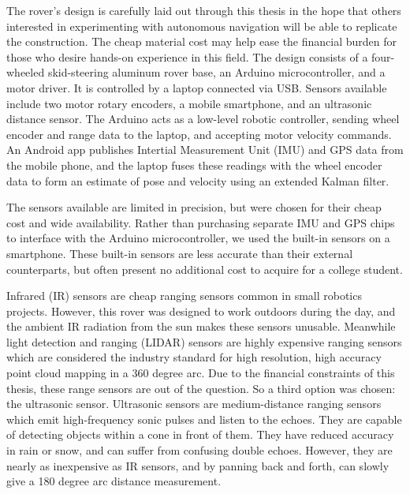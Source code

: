 
The rover's design is carefully laid out through this thesis in the hope that others interested in experimenting with autonomous navigation will be able to replicate the construction. The cheap material cost may help ease the financial burden for those who desire hands-on experience in this field. The design consists of a four-wheeled skid-steering aluminum rover base, an Arduino microcontroller, and a motor driver. It is controlled by a laptop connected via USB. Sensors available include two motor rotary encoders, a mobile smartphone, and an ultrasonic distance sensor. The Arduino acts as a low-level robotic controller, sending wheel encoder and range data to the laptop, and accepting motor velocity commands. An Android app publishes Intertial Measurement Unit (IMU) and GPS data from the mobile phone, and the laptop fuses these readings with the wheel encoder data to form an estimate of pose and velocity using an extended Kalman filter.

The sensors available are limited in precision, but were chosen for their cheap cost and wide availability. Rather than purchasing separate IMU and GPS chips to interface with the Arduino microcontroller, we used the built-in sensors on a smartphone. These built-in sensors are less accurate than their external counterparts, but often present no additional cost to acquire for a college student.

Infrared (IR) sensors are cheap ranging sensors common in small robotics projects. However, this rover was designed to work outdoors during the day, and the ambient IR radiation from the sun makes these sensors unusable. Meanwhile light detection and ranging (LIDAR) sensors are highly expensive ranging sensors which are considered the industry standard for high resolution, high accuracy point cloud mapping in a 360 degree arc. Due to the financial constraints of this thesis, these range sensors are out of the question. So a third option was chosen: the ultrasonic sensor. Ultrasonic sensors are medium-distance ranging sensors which emit high-frequency sonic pulses and listen to the echoes. They are capable of detecting objects within a cone in front of them. They have reduced accuracy in rain or snow, and can suffer from confusing double echoes. However, they are nearly as inexpensive as IR sensors, and by panning back and forth, can slowly give a 180 degree arc distance measurement.

